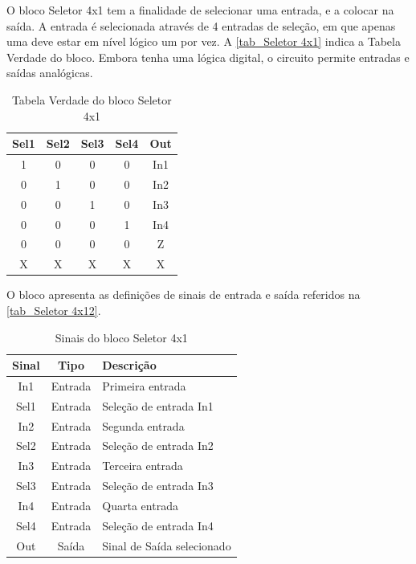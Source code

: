 \renewcommand{\NomeBloco}{Seletor 4x1}
\renewcommand{\NomePTab}{tab_\NomeBloco}
\renewcommand{\NomeSTab}{tab_\NomeBloco2}
\renewcommand{\NomePFig}{fig_\NomeBloco}
\renewcommand{\NomeSFig}{fig_\NomeBloco2}
\renewcommand{\NomeTTab}{tab_\NomeBloco3}

O bloco \NomeBloco{} tem a finalidade de selecionar uma entrada, e a colocar na sa\'ida. A entrada \'e selecionada atrav\'es de 4 entradas de sele{\c c}\~ao, em que apenas uma deve estar em n\'ivel l\'ogico um por vez. A \autoref{\NomePTab} indica a Tabela Verdade do bloco. Embora tenha uma l\'ogica digital, o circuito permite entradas e sa\'idas anal\'ogicas.

\begin{table}[htbp]

\caption{Tabela Verdade do bloco \NomeBloco}%
\label{\NomePTab}
\centering
\begin{tabular}{ccccc}
    \toprule
    Sel1 & Sel2 & Sel3 & Sel4 & Out \\
    \midrule \midrule
    1 & 0 & 0 & 0 & In1 \\
    \midrule
    0 & 1 & 0 & 0 & In2 \\
    \midrule
    0 & 0 & 1 & 0 & In3 \\
    \midrule
    0 & 0 & 0 & 1 & In4 \\
    \midrule
    0 & 0 & 0 & 0 & Z \\
    \midrule
    X & X & X & X & X \\
\bottomrule

\end{tabular}
\end{table}

O bloco apresenta as defini{\c c}\~oes de sinais de entrada e sa\'ida referidos na \autoref{\NomeSTab}.

\begin{table}[htbp]
\caption{Sinais do bloco \NomeBloco}
\label{\NomeSTab}
\centering
\begin{tabular}{ccl}

    \toprule
    Sinal & Tipo    & Descri{\c c}\~ao        \\
    \midrule \midrule
    In1    & Entrada & Primeira entrada \\
    \midrule
    Sel1    & Entrada & Sele{\c c}\~ao de entrada In1 \\
    \midrule
    In2    & Entrada & Segunda entrada \\
    \midrule
    Sel2    & Entrada & Sele{\c c}\~ao de entrada In2 \\
    \midrule
    In3    & Entrada & Terceira entrada \\
    \midrule
    Sel3    & Entrada & Sele{\c c}\~ao de entrada In3 \\
    \midrule
    In4    & Entrada & Quarta entrada \\
    \midrule
    Sel4    & Entrada & Sele{\c c}\~ao de entrada In4 \\
    \midrule
    Out   & Saída   & Sinal de Sa\'ida selecionado   \\
    \bottomrule
\end{tabular}
\end{table}

